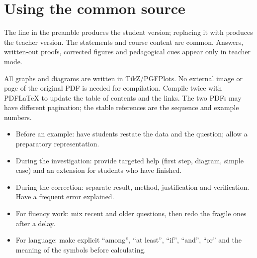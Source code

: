 \ifprof
\clearpage\renewcommand{\titreseq}{Teacher annexes}
\section*{Using the common source}
\begin{cours}
The line \texttt{\string\proffalse} in the preamble produces the student version; replacing it with \texttt{\string\proftrue} produces the teacher version. The statements and course content are common. Answers, written-out proofs, corrected figures and pedagogical cues appear only in teacher mode.
\end{cours}
All graphs and diagrams are written in TikZ/PGFPlots. No external image or page of the original PDF is needed for compilation. Compile twice with PDFLaTeX to update the table of contents and the links. The two PDFs may have different pagination; the stable references are the sequence and example numbers.
\begin{methode}
\begin{itemize}
\item Before an example: have students restate the data and the question; allow a preparatory representation.
\item During the investigation: provide targeted help (first step, diagram, simple case) and an extension for students who have finished.
\item During the correction: separate result, method, justification and verification. Have a frequent error explained.
\item For fluency work: mix recent and older questions, then redo the fragile ones after a delay.
\item For language: make explicit ``among'', ``at least'', ``if'', ``and'', ``or'' and the meaning of the symbols before calculating.
\end{itemize}
\end{methode}
